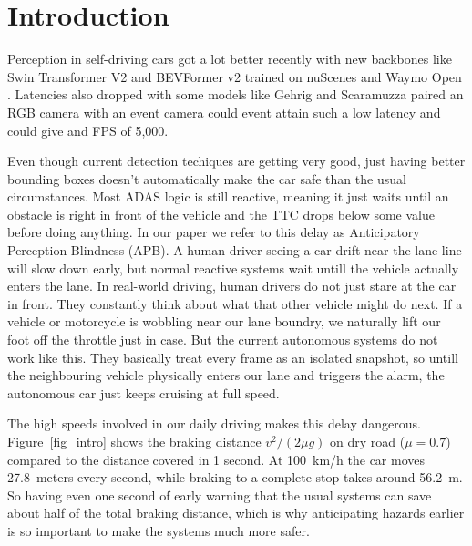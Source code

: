 \documentclass[preprint,12pt]{elsarticle}
\begin{document}
\linenumbers

\section{Introduction}
Perception in self-driving cars got a lot better recently with new backbones like Swin Transformer V2 \cite{liu2022swin} and BEVFormer v2 \cite{yang2023bevformer} trained on nuScenes \cite{caesar2020nuscenes} and Waymo Open \cite{sun2020waymo}. Latencies also dropped with some models like Gehrig and Scaramuzza \cite{gehrig2024low} paired an RGB camera with an event camera could event attain such a low latency and could give and FPS of 5,000.

Even though current detection techiques are getting very good, just having better bounding boxes doesn't automatically make the car safe than the usual circumstances. Most ADAS logic is still reactive, meaning it just waits until an obstacle is right in front of the vehicle and the TTC drops below some value before doing anything. In our paper we refer to this delay as Anticipatory Perception Blindness (APB). A human driver seeing a car drift near the lane line will slow down early, but normal reactive systems wait untill the vehicle actually enters the lane. In real-world driving, human drivers do not just stare at the car in front. They constantly think about what that other vehicle might do next. If a vehicle or motorcycle is wobbling near our lane boundry, we naturally lift our foot off the throttle just in case. But the current autonomous systems do not work like this. They basically treat every frame as an isolated snapshot, so untill the neighbouring vehicle physically enters our lane and triggers the alarm, the autonomous car just keeps cruising at full speed.

The high speeds involved in our daily driving makes this delay dangerous. Figure~\ref{fig_intro} shows the braking distance $v^2/(2\mu g)$ on dry road ($\mu = 0.7$) compared to the distance covered in 1 second. At 100~km/h the car moves 27.8~meters every second, while braking to a complete stop takes around 56.2~m. So having even one second of early warning that the usual systems can save about half of the total braking distance, which is why anticipating hazards earlier is so important to make the systems much more safer.
\end{document}
